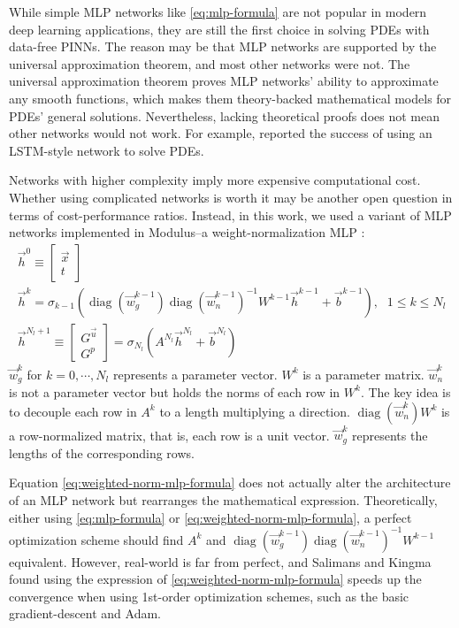 While simple MLP networks like \eqref{eq:mlp-formula} are not popular in modern deep learning applications, they are still the first choice in solving PDEs with data-free PINNs.
The reason may be that MLP networks are supported by the universal approximation theorem, and most other networks were not.
The universal approximation theorem proves MLP networks' ability to approximate any smooth functions, which makes them theory-backed mathematical models for PDEs' general solutions.
Nevertheless, lacking theoretical proofs does not mean other networks would not work.
For example, \cite{sirignano_dgm:_2018} reported the success of using an LSTM-style network to solve PDEs.

Networks with higher complexity imply more expensive computational cost.
Whether using complicated networks is worth it may be another open question in terms of cost-performance ratios. 
Instead, in this work, we used a variant of MLP networks implemented in Modulus--a weight-normalization MLP \cite{salimans_weight_2016}:
\begin{equation}\label{eq:weighted-norm-mlp-formula}
    \begin{array}{ll}
        \vec{h}^0 \equiv \begin{bmatrix} \vec{x} \\ t \end{bmatrix} & \\
        \vec{h}^k = \sigma_{k-1}\left(
            \operatorname{diag}\left(\vec{w}_g^{k-1}\right)
            \operatorname{diag}\left(\vec{w}_n^{k-1}\right)^{-1}
            W^{k-1}\vec{h}^{k-1}+\vec{b}^{k-1}
        \right)\text{,} & 1 \le k \le N_l \\
        \vec{h}^{N_l+1}\equiv \begin{bmatrix} G^{\vec{u}} \\ G^p \end{bmatrix} = \sigma_{N_l}\left(A^{N_l}\vec{h}^{N_l}+\vec{b}^{N_l}\right) &
    \end{array}
\end{equation}
$\vec{w}_g^{k}$ for $k=0,\cdots,N_l$ represents a parameter vector.
$W^k$ is a parameter matrix.
$\vec{w}_n^{k}$ is not a parameter vector but holds the norms of each row in $W^k$.
The key idea is to decouple each row in $A^k$ to a length multiplying a direction.
$\operatorname{diag}\left(\vec{w}_n^k\right)W^k$ is a row-normalized matrix, that is, each row is a unit vector.
$\vec{w}_g^k$ represents the lengths of the corresponding rows.

Equation \eqref{eq:weighted-norm-mlp-formula} does not actually alter the architecture of an MLP network but rearranges the mathematical expression.
Theoretically, either using \eqref{eq:mlp-formula} or \eqref{eq:weighted-norm-mlp-formula}, a perfect optimization scheme should find $A^k$ and $\operatorname{diag}\left(\vec{w}_g^{k-1}\right) \operatorname{diag}\left(\vec{w}_n^{k-1}\right)^{-1} W^{k-1}$ equivalent.
However, real-world is far from perfect, and Salimans and Kingma \cite{salimans_weight_2016} found using the expression of \eqref{eq:weighted-norm-mlp-formula} speeds up the convergence when using 1st-order optimization schemes, such as the basic gradient-descent and Adam.



